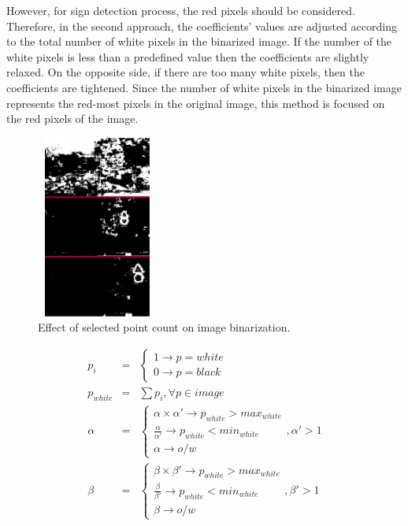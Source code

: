 \documentclass[a4paper,oneside,12pt]{report}
\begin{document}
However, for sign detection process, the red pixels should be considered. Therefore, in the second approach, the coefficients' values are adjusted according to the total number of white pixels in the binarized image. If the number of the white pixels is less than a predefined value then the coefficients are slightly relaxed. On the opposite side, if there are too many white pixels, then the coefficients are tightened. Since the number of white pixels in the binarized image represents the red-most pixels in the original image, this method is focused on the red pixels of the image.
\begin{figure}[ht]
\begin{center}
\includegraphics[width=40mm,height=60mm]{img/adapbright.eps}
\caption{Effect of selected point count on image binarization.}
\label{fig:adapbright}
\end{center}
\end{figure}
\begin{figure}

\begin{eqnarray}
\label{eq3}
p_{i} &=& \left\{\begin{array}{l} 1 \rightarrow p=white \\ 0 \rightarrow p=black \end{array}\right.\\
\nonumber p_{white} &=& \sum{p_{i}}, \forall p \in image \\
\nonumber \alpha &=& \left\{\begin{array}{l} \alpha \times \alpha' \rightarrow p_{white}>max_{white} \\ \frac{\alpha}{\alpha'}\rightarrow p_{white}<min_{white} \\ \alpha \rightarrow o/w \end{array}\right., \alpha'>1\\
\nonumber \beta &=& \left\{\begin{array}{l} \beta \times \beta' \rightarrow p_{white}>max_{white} \\ \frac{\beta}{\beta'}\rightarrow p_{white}<min_{white} \\ \beta \rightarrow o/w \end{array}\right., \beta'>1
\end{eqnarray}
\end{figure}
\end{document}
